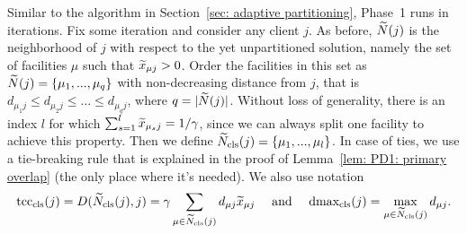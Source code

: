 Similar to the algorithm in Section~\ref{sec: adaptive partitioning},
Phase~1 runs in iterations. Fix some iteration and consider any client $j$.  As before,
${\widetilde N}(j)$ is the neighborhood of $j$ with respect to the yet
unpartitioned solution, namely the set of facilities $\mu$ such that
${\widetilde x}_{\mu j}>0$. Order the facilities in this set as
${\widetilde N}(j) = { \left\{ \mu_1,...,\mu_q \right\} }$ with non-decreasing
distance from $j$, that is
$d_{\mu_1 j} \leq d_{\mu_2 j} \leq \ldots \leq d_{\mu_q j}$, where
$q = |{\widetilde N}(j)|$. Without loss of generality, there is an index
$l$ for which $\sum_{s=1}^l {\widetilde x}_{\mu_s j} = 1/\gamma$, since we can
always split one facility to achieve this property. Then we define
${\widetilde N}_{\text{cls}}(j) = { \left\{ \mu_1,...,\mu_l \right\} }$. In case of ties, we use
a tie-breaking rule that is explained in the proof of Lemma~\ref{lem: PD1: primary overlap}
(the only place where it's needed). We also use notation
%
\begin{equation*}
\mbox{\rm{tcc}}_{\text{cls}}(j) =  D({\widetilde N}_{\text{cls}}(j), j) = \gamma\sum_{\mu\in{\widetilde N}_{\text{cls}}(j)} d_{\mu j} {\widetilde x}_{\mu j}
			\quad\textrm{ and }\quad
 \mbox{\rm{dmax}}_{\text{cls}}(j) = \max_{\mu \in {\widetilde N}_{\text{cls}}(j)} d_{\mu j}. 
\end{equation*}
%

